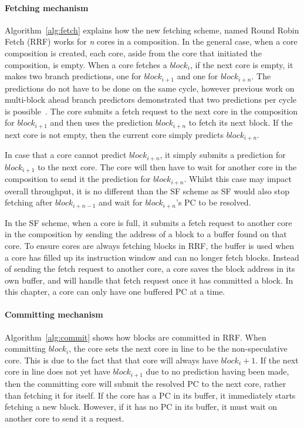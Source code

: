 \paragraph*{Fetching mechanism}
Algorithm~\ref{alg:fetch} explains how the new fetching scheme, named Round Robin Fetch (RRF) works for \textit{n} cores in a composition.
In the general case, when a core composition is created, each core, aside from the core that initiated the composition, is empty.
When a core fetches a $block_i$, if the next core is empty, it makes two branch predictions, one for $block_{i+1}$ and one for $block_{i+n}$.
The predictions do not have to be done on the same cycle, however previous work on multi-block ahead branch predictors demonstrated that two predictions per cycle is possible~\cite{SeznecMultipleBlock}.
The core submits a fetch request to the next core in the composition for $block_{i+1}$ and then uses the prediction $block_{i+n}$ to fetch its next block.
If the next core is not empty, then the current core simply predicts $block_{i+n}$.

In case that a core cannot predict $block_{i+n}$, it simply submits a prediction for $block_{i+1}$ to the next core.
The core will then have to wait for another core in the composition to send it the prediction for $block_{i+n}$.
Whilst this case may impact overall throughput, it is no different than the SF scheme as SF would also stop fetching after $block_{i+n-1}$ and wait for $block_{i+n}$'s PC to be resolved.

In the SF scheme, when a core is full, it submits a fetch request to another core in the composition by sending the address of a block to a buffer found on that core.
To ensure cores are always fetching blocks in RRF, the buffer is used when a core has filled up its instruction window and can no longer fetch blocks.
Instead of sending the fetch request to another core, a core saves the block address in its own buffer, and will handle that fetch request once it has committed a block.
In this chapter, a core can only have one buffered PC at a time.

\paragraph*{Committing mechanism}
Algorithm~\ref{alg:commit} shows how blocks are committed in RRF.
When committing $block_i$, the core sets the next core in line to be the non-speculative core.
This is due to the fact that that core will always have $block_i+1$.
If the next core in line does not yet have $block_{i+1}$ due to no prediction having been made, then the committing core will submit the resolved PC to the next core, rather than fetching it for itself.
If the core has a PC in its buffer, it immediately starts fetching a new block.
However, if it has no PC in its buffer, it must wait on another core to send it a request.


